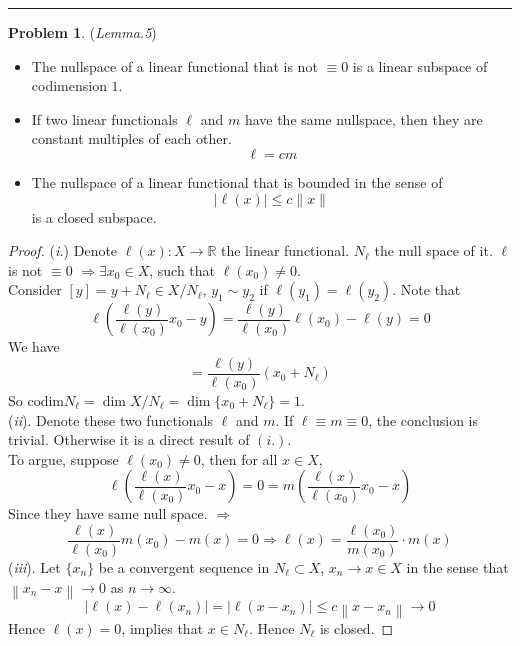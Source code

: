 \documentclass[a4paper, 10pt]{article}
\theoremstyle{definition}
\newtheorem{problem}{Problem}
\theoremstyle{hSol}
\begin{document}
\noindent\rule{16cm}{0.4pt}
\begin{problem} (\textit{Lemma.5}) 
\begin{itemize}
	\item[\textit{i.}] The nullspace of a linear functional that is not $\equiv 0$ is a linear subspace of codimension $1$.
	\item[\textit{ii.}] If two linear functionals $\ell$ and $m$ have the same nullspace, then they are constant multiples of each other.
	$$\ell=cm$$
	\item[\textit{iii.}] The nullspace of a linear functional that is bounded in the sense of
	$$|\ell(x)|\leq c \|x\|$$
	is a closed subspace.
\end{itemize}
\end{problem}
\begin{proof} (\textit{i.}) Denote $\ell(x): X\to \mathbb{R}$ the linear functional. $N_{\ell}$ the null space of it. $\ell$ is not $\equiv 0$ $\Rightarrow \exists x_0 \in X$, such that $\ell(x_0)\ne 0$.\\
Consider $[y]=y+N_{\ell}\in X/N_{\ell}$, $y_1 \sim y_2$ if $\ell(y_1)=\ell(y_2)$. Note that
\begin{equation}
	\ell\left(\frac{\ell(y)}{\ell(x_0)}x_0-y\right) = \frac{\ell(y)}{\ell(x_0)} \ell(x_0) - \ell(y) = 0
\end{equation}
We have 
\begin{equation}
	[y]= \frac{\ell(y)}{\ell(x_0)}\left(x_0 + N_{\ell}\right)
\end{equation}	
So $\text{codim}N_{\ell} = \dim X/N_{\ell} = \dim\{x_0 + N_{\ell}\} = 1$. \\
(\textit{ii}). Denote these two functionals $\ell$ and $m$. If $\ell \equiv m \equiv 0$, the conclusion is trivial. Otherwise it is a direct result of $(i.)$. \\
To argue, suppose $\ell(x_0)\ne 0$, then for all $x\in X$,
\begin{equation}
	\ell\left(\frac{\ell(x)}{\ell(x_0)}x_0-x\right) = 0 = m\left(\frac{\ell(x)}{\ell(x_0)}x_0-x\right)
\end{equation}
Since they have same null space. $\Rightarrow$
\begin{equation}
	\frac{\ell(x)}{\ell(x_0)} m(x_0) - m(x) = 0 \Rightarrow \ell(x) = \frac{\ell(x_0)}{m(x_0)}\cdot m(x)
\end{equation}
(\textit{iii}). Let $\{x_n\}$ be a convergent sequence in $N_{\ell} \subset X$, $x_n \to x \in X$ in the sense that $\left\|x_n - x\right\| \to 0$ as $n\to \infty$.
\begin{equation}
	|\ell(x) - \ell(x_n)| = |\ell(x-x_n)| \leq c \left\|x-x_n\right\| \to 0
\end{equation}
Hence $\ell(x)=0$, implies that $x\in N_{\ell}$. Hence $N_{\ell}$ is closed.
\end{proof}
\end{document}
